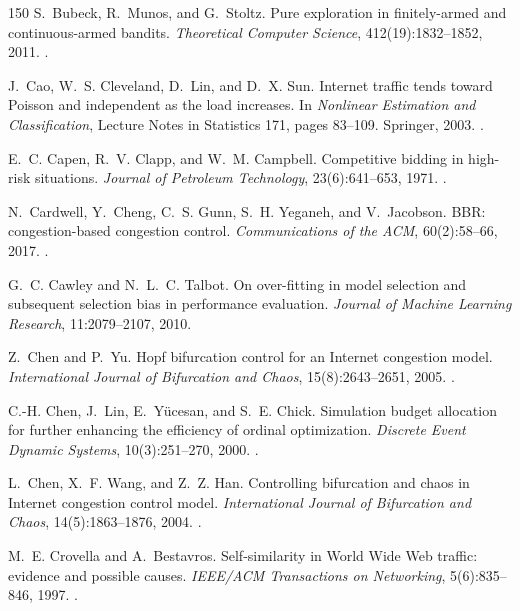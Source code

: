 \begin{thebibliography}{150}
S.~Bubeck, R.~Munos, and G.~Stoltz. Pure exploration in finitely-armed and continuous-armed bandits. \emph{Theoretical Computer Science}, 412(19):1832--1852, 2011. .

J.~Cao, W.~S. Cleveland, D.~Lin, and D.~X. Sun. Internet traffic tends toward Poisson and independent as the load increases. In \emph{Nonlinear Estimation and Classification}, Lecture Notes in Statistics 171, pages 83--109. Springer, 2003. .

E.~C. Capen, R.~V. Clapp, and W.~M. Campbell. Competitive bidding in high-risk situations. \emph{Journal of Petroleum Technology}, 23(6):641--653, 1971. .

N.~Cardwell, Y.~Cheng, C.~S. Gunn, S.~H. Yeganeh, and V.~Jacobson. BBR: congestion-based congestion control. \emph{Communications of the ACM}, 60(2):58--66, 2017. .

G.~C. Cawley and N.~L.~C. Talbot. On over-fitting in model selection and subsequent selection bias in performance evaluation. \emph{Journal of Machine Learning Research}, 11:2079--2107, 2010.

Z.~Chen and P.~Yu. Hopf bifurcation control for an Internet congestion model. \emph{International Journal of Bifurcation and Chaos}, 15(8):2643--2651, 2005. .

C.-H. Chen, J.~Lin, E.~Y{\"u}cesan, and S.~E. Chick. Simulation budget allocation for further enhancing the efficiency of ordinal optimization. \emph{Discrete Event Dynamic Systems}, 10(3):251--270, 2000. .

L.~Chen, X.~F. Wang, and Z.~Z. Han. Controlling bifurcation and chaos in Internet congestion control model. \emph{International Journal of Bifurcation and Chaos}, 14(5):1863--1876, 2004. .

M.~E. Crovella and A.~Bestavros. Self-similarity in World Wide Web traffic: evidence and possible causes. \emph{IEEE/ACM Transactions on Networking}, 5(6):835--846, 1997. .


\end{thebibliography}
